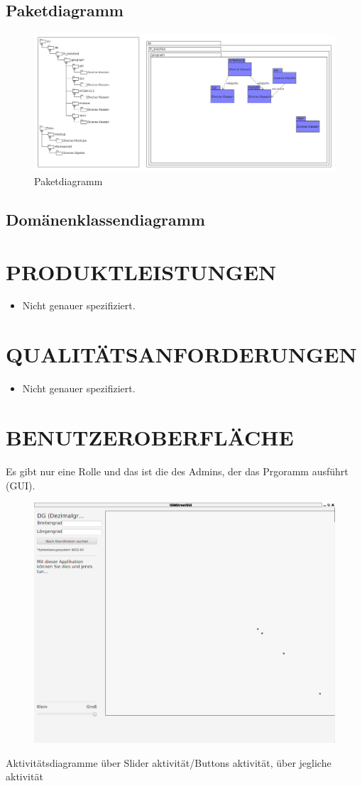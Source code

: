 	\subsection{Paketdiagramm}
		\begin{figure}[H]
			\centering
			\includegraphics[width=0.7\linewidth]{images/Paketdiagramm}
			\caption{Paketdiagramm}
			\label{fig:Paketdiagramm}
		\end{figure}
	\subsection{Domänenklassendiagramm}
	\section{\Large PRODUKTLEISTUNGEN}
	\begin{itemize}
		\item Nicht genauer spezifiziert.
	\end{itemize} 
		
	
	\section{\Large QUALITÄTSANFORDERUNGEN}
	\begin{itemize}
		\item Nicht genauer spezifiziert.
	\end{itemize}
	
	\section{\Large BENUTZEROBERFLÄCHE}
	Es gibt nur eine Rolle und das ist die des Admins, der das Prgoramm ausführt (GUI).
	\begin{figure}[H]
	\centering
	\includegraphics[width=0.7\linewidth]{images/GUI}
	\caption{}
	\label{fig:GUI}
	\end{figure}
	Aktivitätsdiagramme über Slider aktivität/Buttons aktivität, über jegliche aktivität
